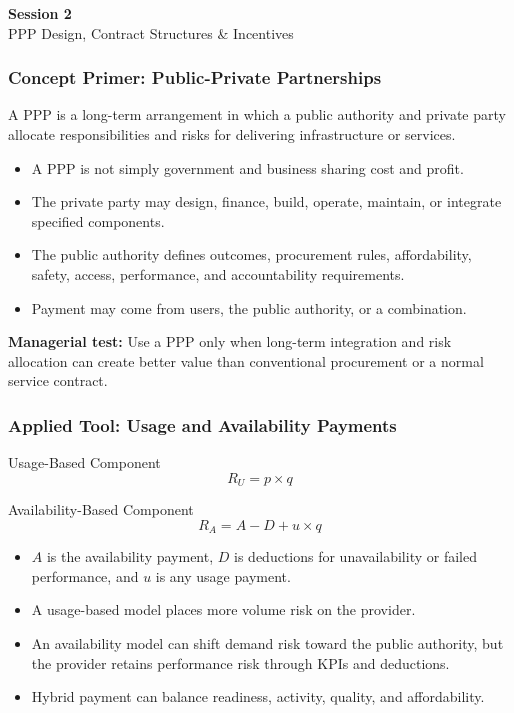 \documentclass{beamer}
\begin{document}
\begin{frame}[c]
  \begin{center}
    \huge\color{cuhkpurple}\textbf{Session 2}\\
    \vspace{0.5cm}
    \Large PPP Design, Contract Structures \& Incentives
  \end{center}
\end{frame}

\begin{frame}[t]
\frametitle{Concept Primer: Public-Private Partnerships}
A PPP is a long-term arrangement in which a public authority and private party allocate responsibilities and risks for delivering infrastructure or services.
\begin{itemize}
\item A PPP is not simply government and business sharing cost and profit.
\item The private party may design, finance, build, operate, maintain, or integrate specified components.
\item The public authority defines outcomes, procurement rules, affordability, safety, access, performance, and accountability requirements.
\item Payment may come from users, the public authority, or a combination.
\end{itemize}
\textbf{Managerial test:} Use a PPP only when long-term integration and risk allocation can create better value than conventional procurement or a normal service contract.
\end{frame}

\begin{frame}[t,shrink=10]
\frametitle{Applied Tool: Usage and Availability Payments}
\begin{block}{Usage-Based Component}
\[R_U=p\times q\]
\end{block}
\begin{block}{Availability-Based Component}
\[R_A=A-D+u\times q\]
\end{block}
\begin{itemize}
\item $A$ is the availability payment, $D$ is deductions for unavailability or failed performance, and $u$ is any usage payment.
\item A usage-based model places more volume risk on the provider.
\item An availability model can shift demand risk toward the public authority, but the provider retains performance risk through KPIs and deductions.
\item Hybrid payment can balance readiness, activity, quality, and affordability.
\end{itemize}
\end{frame}
\end{document}
